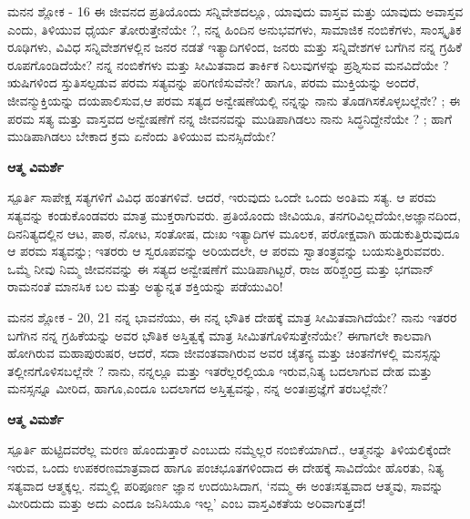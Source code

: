 \newpage
\begin{mananam}{\mananamfont ಮನನ ಶ್ಲೋಕ - \textenglish{16}}
\footnotesize \mananamtext ಈ ಜೀವನದ ಪ್ರತಿಯೊಂದು ಸನ್ನಿವೇಶದಲ್ಲೂ, ಯಾವುದು ವಾಸ್ತವ ಮತ್ತು ಯಾವುದು ಅವಾಸ್ತವ ಎಂದು, ತಿಳಿಯುವ ಧೈರ್ಯ ತೋರುತ್ತೇನೆಯೇ ?, ನನ್ನ ಹಿಂದಿನ ಅನುಭವಗಳು, ಸಾಮಾಜಿಕ ನಂಬಿಕೆಗಳು, ಸಾಂಸ್ಕೃತಿಕ ರೂಢಿಗಳು, ವಿವಿಧ ಸನ್ನಿವೇಶಗಳಲ್ಲಿನ ಜನರ ನಡತೆ ಇತ್ಯಾದಿಗಳಿಂದ, ಜನರು ಮತ್ತು ಸನ್ನಿವೇಶಗಳ ಬಗೆಗಿನ ನನ್ನ ಗ್ರಹಿಕೆ ರೂಪಗೊಂಡಿದೆಯೇ? ನನ್ನ ನಂಬಿಕೆಗಳು ಮತ್ತು ಸೀಮಿತವಾದ ತಾರ್ಕಿಕ ನಿಲುವುಗಳನ್ನು ಪ್ರಶ್ನಿಸುವ ಮನವಿದೆಯೇ ? ಋಷಿಗಳಿಂದ ಸ್ತುತಿಸಲ್ಪಡುವ ಪರಮ ಸತ್ಯವನ್ನು ಪರಿಗಣಿಸುವೆನೇ? ಹಾಗೂ, ಪರಮ ಮುಕ್ತಿಯನ್ನು ಅಂದರೆ, ಜೀವನ್ಮುಕ್ತಿಯನ್ನು ದಯಪಾಲಿಸುವ,ಆ ಪರಮ ಸತ್ಯದ ಅನ್ವೇಷಣೆಯಲ್ಲಿ ನನ್ನನ್ನು ನಾನು ತೊಡಗಿಸಕೊಳ್ಳಬಲ್ಲೆನೇ? ; ಈ ಪರಮ ಸತ್ಯ ಮತ್ತು ವಾಸ್ತವದ ಅನ್ವೇಷಣೆಗೆ ನನ್ನ ಜೀವನವನ್ನು ಮುಡಿಪಾಗಿಡಲು ನಾನು ಸಿದ್ಧನಿದ್ದೇನೆಯೇ ? ; ಹಾಗೆ ಮುಡಿಪಾಗಿಡಲು ಬೇಕಾದ ಕ್ರಮ ಏನೆಂದು ತಿಳಿಯುವ ಮನಸ್ಸಿದೆಯೇ?
\end{mananam}
\WritingHand\enspace\textbf{ಆತ್ಮ ವಿಮರ್ಶೆ}
\begin{inspiration}{\mananamfont ಸ್ಪೂರ್ತಿ}
\footnotesize \mananamtext ಸಾಪೇಕ್ಷ ಸತ್ಯಗಳಿಗೆ ವಿವಿಧ ಹಂತಗಳಿವೆ. ಆದರೆ, ಇರುವುದು ಒಂದೇ ಒಂದು ಅಂತಿಮ ಸತ್ಯ. ಆ ಪರಮ ಸತ್ಯವನ್ನು ಕಂಡುಕೊಂಡವರು ಮಾತ್ರ ಮುಕ್ತರಾಗುವರು. ಪ್ರತಿಯೊಂದು ಜೀವಿಯೂ, ತನಗರಿವಿಲ್ಲದೆಯೇ,ಅಜ್ಞಾನದಿಂದ, ದಿನನಿತ್ಯದಲ್ಲಿನ ಆಟ, ಪಾಠ, ನೋಟ, ಸಂತೋಷ, ದುಃಖ ಇತ್ಯಾದಿಗಳ ಮೂಲಕ, ಪರೋಕ್ಷವಾಗಿ ಹುಡುಕುತ್ತಿರುವುದೂ ಆ ಪರಮ ಸತ್ಯವನ್ನು; ಇತರರು ಆ ಸ್ವರೂಪವನ್ನು ಅರಿಯದಲೇ, ಆ ಪರಮ ಸ್ವಾತಂತ್ರ್ಯವನ್ನು ಬಯಸುತ್ತಿರುವವರು. ಒಮ್ಮೆ ನೀವು ನಿಮ್ಮ ಜೀವನವನ್ನು ಈ ಸತ್ಯದ ಅನ್ವೇಷಣೆಗೆ ಮುಡಿಪಾಗಿಟ್ಟರೆ, ರಾಜ ಹರಿಶ್ಚಂದ್ರ ಮತ್ತು ಭಗವಾನ್ ರಾಮನಂತೆ ಮಾನಸಿಕ ಬಲ ಮತ್ತು ಅತ್ಯುನ್ನತ ಶಕ್ತಿಯನ್ನು ಪಡೆಯುವಿರಿ!
\end{inspiration}

\newpage
\begin{mananam}{\mananamfont ಮನನ ಶ್ಲೋಕ - \textenglish{20, 21}}
\footnotesize \mananamtext ನನ್ನ ಭಾವನೆಯು, ಈ ನನ್ನ ಭೌತಿಕ ದೇಹಕ್ಕೆ ಮಾತ್ರ ಸೀಮಿತವಾಗಿದೆಯೇ? ನಾನು ಇತರರ ಬಗೆಗಿನ ನನ್ನ ಗ್ರಹಿಕೆಯನ್ನು ಅವರ ಭೌತಿಕ ಅಸ್ತಿತ್ವಕ್ಕೆ ಮಾತ್ರ ಸೀಮಿತಗೊಳಿಸುತ್ತೇನೆಯೇ? ಈಗಾಗಲೇ ಕಾಲವಾಗಿ ಹೋಗಿರುವ ಮಹಾಪುರುಷರ, ಆದರೆ, ಸದಾ ಜೀವಂತವಾಗಿರುವ ಅವರ ಚೈತನ್ಯ ಮತ್ತು ಚಿಂತನೆಗಳಲ್ಲಿ ಮನಸ್ಸನ್ನು ತಲ್ಲೀನಗೊಳಿಸಬಲ್ಲೆನೇ ? ನಾನು, ನನ್ನಲ್ಲೂ ಮತ್ತು ಇತರೆಲ್ಲರಲ್ಲಿಯೂ ಇರುವ,ನಿತ್ಯ ಬದಲಾಗುವ ದೇಹ ಮತ್ತು ಮನಸ್ಸನ್ನೂ ಮೀರಿದ, ಹಾಗೂ,ಎಂದೂ ಬದಲಾಗದ ಅಸ್ತಿತ್ವವನ್ನು, ನನ್ನ ಅಂತಃಪ್ರಜ್ಞೆಗೆ ತರಬಲ್ಲೆನೇ?
\end{mananam}
\WritingHand\enspace\textbf{ಆತ್ಮ ವಿಮರ್ಶೆ}
\begin{inspiration}{\mananamfont ಸ್ಪೂರ್ತಿ}
\footnotesize \mananamtext ಹುಟ್ಟಿದವರೆಲ್ಲ ಮರಣ ಹೊಂದುತ್ತಾರೆ ಎಂಬುದು ನಮ್ಮೆಲ್ಲರ ನಂಬಿಕೆಯಾಗಿದೆ., ಆತ್ಮನನ್ನು ತಿಳಿಯಲಿಕ್ಕೆಂದೇ ಇರುವ, ಒಂದು ಉಪಕರಣಮಾತ್ರವಾದ ಹಾಗೂ ಪಂಚಭೂತಗಳಿಂದಾದ ಈ ದೇಹಕ್ಕೆ ಸಾವಿದೆಯೇ ಹೊರತು, ನಿತ್ಯ ಸತ್ಯವಾದ ಆತ್ಮಕ್ಕಲ್ಲ. ನಮ್ಮಲ್ಲಿ ಪರಿಪೂರ್ಣ ಜ್ಞಾನ ಉದಯಿಸಿದಾಗ, ‘ನಮ್ಮ ಈ ಅಂತಃಸತ್ವವಾದ ಆತ್ಮವು, ಸಾವನ್ನು ಮೀರಿದುದು ಮತ್ತು ಅದು ಎಂದೂ ಜನಿಸಿಯೂ ಇಲ್ಲ’ ಎಂಬ ವಾಸ್ತವಿಕತೆಯ ಅರಿವಾಗುತ್ತದೆ!
\end{inspiration}
\newpage



